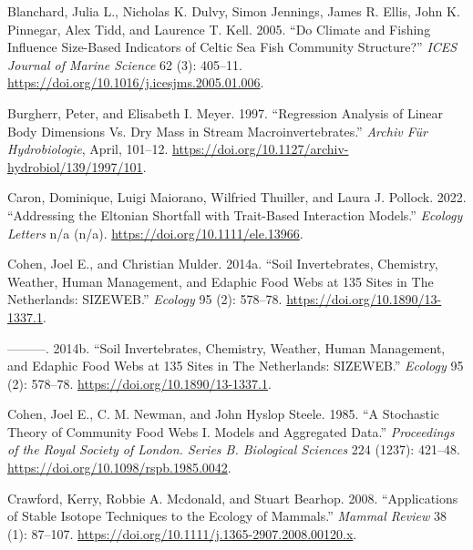 \documentclass{article}
\newlength{\cslhangindent}
\newlength{\cslentryspacingunit} %
\newenvironment{CSLReferences}[2] %
 {%
  \setlength{\parindent}{0pt}
  \ifodd #1
  \let\oldpar\par
  \def\par{\hangindent=\cslhangindent\oldpar}
  \fi
  \setlength{\parskip}{#2\cslentryspacingunit}
 }%
 {}
\begin{document}
\begin{CSLReferences}{1}{0}
\leavevmode{}%
Blanchard, Julia L., Nicholas K. Dulvy, Simon Jennings, James R. Ellis,
John K. Pinnegar, Alex Tidd, and Laurence T. Kell. 2005. {``Do Climate
and Fishing Influence Size-Based Indicators of {Celtic Sea} Fish
Community Structure?''} \emph{ICES Journal of Marine Science} 62 (3):
405--11. \url{https://doi.org/10.1016/j.icesjms.2005.01.006}.

\leavevmode{}%
Burgherr, Peter, and Elisabeth I. Meyer. 1997. {``Regression Analysis of
Linear Body Dimensions Vs. Dry Mass in Stream Macroinvertebrates.''}
\emph{Archiv Für Hydrobiologie}, April, 101--12.
\url{https://doi.org/10.1127/archiv-hydrobiol/139/1997/101}.

\leavevmode{}%
Caron, Dominique, Luigi Maiorano, Wilfried Thuiller, and Laura J.
Pollock. 2022. {``Addressing the {Eltonian} Shortfall with Trait-Based
Interaction Models.''} \emph{Ecology Letters} n/a (n/a).
\url{https://doi.org/10.1111/ele.13966}.

\leavevmode{}%
Cohen, Joel E., and Christian Mulder. 2014a. {``Soil Invertebrates,
Chemistry, Weather, Human Management, and Edaphic Food Webs at 135 Sites
in {The Netherlands}: {SIZEWEB}.''} \emph{Ecology} 95 (2): 578--78.
\url{https://doi.org/10.1890/13-1337.1}.

\leavevmode{}%
---------. 2014b. {``Soil Invertebrates, Chemistry, Weather, Human
Management, and Edaphic Food Webs at 135 Sites in The Netherlands:
SIZEWEB.''} \emph{Ecology} 95 (2): 578--78.
\url{https://doi.org/10.1890/13-1337.1}.

\leavevmode{}%
Cohen, Joel E., C. M. Newman, and John Hyslop Steele. 1985. {``A
Stochastic Theory of Community Food Webs {I}. {Models} and Aggregated
Data.''} \emph{Proceedings of the Royal Society of London. Series B.
Biological Sciences} 224 (1237): 421--48.
\url{https://doi.org/10.1098/rspb.1985.0042}.

\leavevmode{}%
Crawford, Kerry, Robbie A. Mcdonald, and Stuart Bearhop. 2008.
{``Applications of Stable Isotope Techniques to the Ecology of
Mammals.''} \emph{Mammal Review} 38 (1): 87--107.
\url{https://doi.org/10.1111/j.1365-2907.2008.00120.x}.


\end{CSLReferences}
\end{document}
